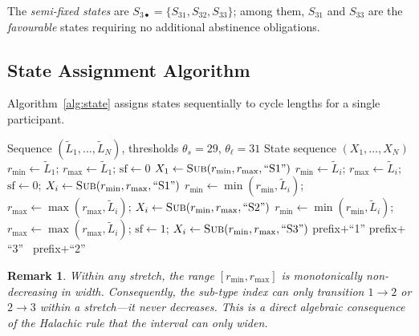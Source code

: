 \documentclass[12pt,a4paper]{article}
\newtheorem{remark}{Remark}
\begin{document}
The \emph{semi-fixed states} are $S_{3\bullet} = \{S_{31}, S_{32}, S_{33}\}$;
among them, $S_{31}$ and $S_{33}$ are the \emph{favourable} states requiring
no additional abstinence obligations.

\subsection{State Assignment Algorithm}
\label{sec:algorithm}

Algorithm~\ref{alg:state} assigns states sequentially to cycle lengths for a
single participant.

\begin{algorithm}[ht]
\caption{Semi-fixed state assignment (single participant)}
\label{alg:state}
\begin{algorithmic}[1]
\Require Sequence $(\tilde{L}_1,\ldots,\tilde{L}_N)$,
         thresholds $\theta_s = 29$, $\theta_\ell = 31$
\Ensure State sequence $(X_1,\ldots,X_N)$
\State $r_{\min} \gets \tilde{L}_1$;\; $r_{\max} \gets \tilde{L}_1$;\;
       $\text{sf} \gets 0$ 
\State $X_1 \gets \textsc{Sub}(r_{\min}, r_{\max}, \text{``S1''})$
    \State $r_{\min}\!\gets\!\tilde{L}_i$;\; $r_{\max}\!\gets\!\tilde{L}_i$;\;
           $\text{sf}\!\gets\!0$;\;
           $X_i \gets \textsc{Sub}(r_{\min}, r_{\max}, \text{``S1''})$
    \State $r_{\min}\!\gets\!\min(r_{\min},\tilde{L}_i)$;\;
           $r_{\max}\!\gets\!\max(r_{\max},\tilde{L}_i)$;\;
           $X_i \gets \textsc{Sub}(r_{\min}, r_{\max}, \text{``S2''})$
  \Else
    \State $r_{\min}\!\gets\!\min(r_{\min},\tilde{L}_i)$;\;
           $r_{\max}\!\gets\!\max(r_{\max},\tilde{L}_i)$;\;
           $\text{sf}\!\gets\!1$;\;
           $X_i \gets \textsc{Sub}(r_{\min}, r_{\max}, \text{``S3''})$
  \EndIf
\EndFor
{}
   \Return prefix$+$``1''
   \Return prefix$+$``3''
  \Else\ \Return prefix$+$``2''
  \EndIf
\EndProcedure
\end{algorithmic}
\end{algorithm}

\begin{remark}\label{rem:monotone}
Within any stretch, the range $[r_{\min}, r_{\max}]$ is monotonically
non-decreasing in width.  Consequently, the sub-type index can only
transition $1 \to 2$ or $2 \to 3$ within a stretch---it never decreases.
This is a direct algebraic consequence of the Halachic rule that the interval
can only widen.
\end{remark}
\end{document}
